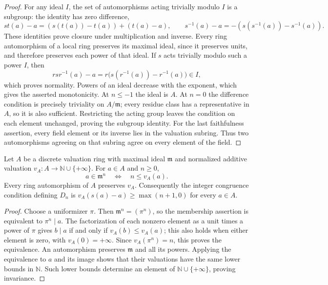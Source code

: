 \begin{proof}
For any ideal $I$, the set of automorphisms acting trivially modulo $I$
is a subgroup: the identity has zero difference,
\[
 st(a)-a=(s(t(a))-t(a))+(t(a)-a),\qquad
 s^{-1}(a)-a=-(s(s^{-1}(a))-s^{-1}(a)).
\]
These identities prove closure under multiplication and inverse.
Every ring automorphism of a local ring preserves its maximal ideal,
since it preserves units, and therefore preserves each power of that
ideal. If $s$ acts trivially modulo such a power $I$, then
\[
 rsr^{-1}(a)-a=r\bigl(s(r^{-1}(a))-r^{-1}(a)\bigr)\in I,
\]
which proves normality. Powers of an ideal decrease with the exponent,
which gives the asserted monotonicity. At $n\leq-1$ the ideal is $A$.
At $n=0$ the difference condition is precisely triviality on $A/\mathfrak m$;
every residue class has a representative in $A$, so it is also sufficient.
Restricting the acting group leaves the condition on each element
unchanged, proving the subgroup identity.
For the last faithfulness assertion, every field element or its inverse
lies in the valuation subring. Thus two automorphisms agreeing on that
subring agree on every element of the field.
\end{proof}

\begin{lemma}
\label{fw:ideal-power-valuation}
\leanok
Let $A$ be a discrete valuation ring with maximal ideal $\mathfrak m$
and normalized additive valuation $v_A:A\to\mathbb N\cup\{+\infty\}$.
For $a\in A$ and $n\geq0$,
\[
 a\in\mathfrak m^n\quad\Longleftrightarrow\quad n\leq v_A(a).
\]
Every ring automorphism of $A$ preserves $v_A$.
Consequently the integer congruence condition defining $D_n$ is
$v_A(s(a)-a)\geq\max(n+1,0)$ for every $a\in A$.
\end{lemma}
\begin{proof}
Choose a uniformizer $\pi$. Then $\mathfrak m^n=(\pi^n)$,
so the membership assertion is equivalent to $\pi^n\mid a$.
The factorization of each nonzero element as a unit times a power of
$\pi$ gives $b\mid a$ if and only if $v_A(b)\leq v_A(a)$;
this also holds when either element is zero, with $v_A(0)=+\infty$.
Since $v_A(\pi^n)=n$, this proves the equivalence.
An automorphism preserves $\mathfrak m$ and all its powers. Applying
the equivalence to $a$ and its image shows that their valuations have
the same lower bounds in $\mathbb N$. Such lower bounds determine an
element of $\mathbb N\cup\{+\infty\}$, proving invariance.
\end{proof}

